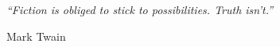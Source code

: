 \clearpage
\thispagestyle{plain}
\phantom{.}\vfill
\begin{center}
  \begin{minipage}{0.6\textwidth}
    {\it ``Fiction is obliged to stick to possibilities. Truth isn't.''}

    {\hfill Mark Twain}
  \end{minipage}%
\end{center}
\vfill
\vspace{10cm}
